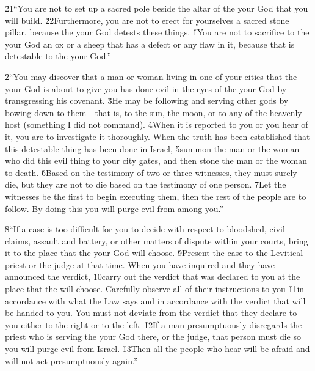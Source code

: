 \v{21}``You are not to set up a sacred pole beside the altar of the  your God that you will build. \v{22}Furthermore, you are not to erect for yourselves a sacred stone pillar, because the  your God detests these things.
\v{1}You are not to sacrifice to the  your God an ox or a sheep that has a defect or any flaw in it, because that is detestable to the  your God.''

\v{2}``You may discover that a man or woman living in one of your cities that the  your God is about to give you has done evil in the eyes of the  your God by transgressing his covenant. \v{3}He may be following and serving other gods by bowing down to them---that is, to the sun, the moon, or to any of the heavenly host (something I did not command). \v{4}When it is reported to you or you hear of it, you are to investigate it thoroughly. When the truth has been established that this detestable thing has been done in Israel, \v{5}summon the man or the woman who did this evil thing to your city gates, and then stone the man or the woman to death. \v{6}Based on the testimony of two or three witnesses, they must surely die, but they are not to die based on the testimony of one person. \v{7}Let the witnesses be the first to begin executing them, then the rest of the people are to follow. By doing this you will purge evil from among you.''

\v{8}``If a case is too difficult for you to decide with respect to bloodshed, civil claims, assault and battery, or other matters of dispute within your courts, bring it to the place that the  your God will choose. \v{9}Present the case to the Levitical priest or the judge at that time. When you have inquired and they have announced the verdict, \v{10}carry out the verdict that was declared to you at the place that the  will choose. Carefully observe all of their instructions to you \v{11}in accordance with what the Law says and in accordance with the verdict that will be handed to you. You must not deviate from the verdict that they declare to you either to the right or to the left. \v{12}If a man presumptuously disregards the priest who is serving the  your God there, or the judge, that person must die so you will purge evil from Israel. \v{13}Then all the people who hear will be afraid and will not act presumptuously again.''

